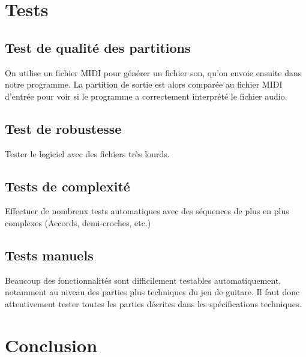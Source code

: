 \documentclass[12pt]{article}
\begin{document}
\newpage
\section{Tests}

\subsection{Test de qualité des partitions}
On utilise un fichier MIDI pour générer un fichier son, qu’on envoie ensuite dans notre programme. La partition de sortie est alors comparée au fichier MIDI d’entrée pour voir si le programme a correctement interprété le fichier audio.\\

\subsection{Test de robustesse}
Tester le logiciel avec des fichiers très lourds.

\subsection{Tests de complexité}
Effectuer de nombreux tests automatiques avec des séquences de plus en plus complexes (Accords, demi-croches, etc.)

\subsection{Tests manuels}
Beaucoup des fonctionnalités sont difficilement testables automatiquement, notamment au niveau des parties plus techniques du jeu de guitare. Il faut donc attentivement tester toutes les parties décrites dans les spécifications techniques.

\newpage
\section{Conclusion}
\end{document}
